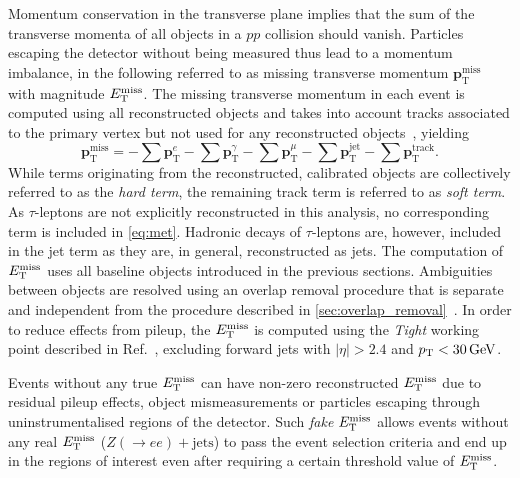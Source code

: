 Momentum conservation in the transverse plane implies that the sum of the transverse momenta of all objects in a $pp$ collision should vanish. Particles escaping the detector without being measured thus lead to a momentum imbalance, in the following referred to as missing transverse momentum $\boldsymbol{p}^{\textrm{miss}}_\textrm{T}$ with magnitude $E_{\textrm{T}}^{\textrm{miss}}$. The missing transverse momentum in each event is computed using all reconstructed objects and takes into account tracks associated to the primary vertex but not used for any reconstructed objects~\cite{PERF-2016-07}, yielding
\begin{equation}
	\boldsymbol{p}^{\textrm{miss}}_\textrm{T} = - \sum\boldsymbol{p}^{e}_{\textrm{T}} - \sum\boldsymbol{p}^{\gamma}_{\textrm{T}} - \sum\boldsymbol{p}^{\mu}_{\textrm{T}} - \sum\boldsymbol{p}^{\mathrm{jet}}_{\textrm{T}} - \sum\boldsymbol{p}^{\mathrm{track}}_{\textrm{T}}.
	\label{eq:met}
\end{equation}
While terms originating from the reconstructed, calibrated objects are collectively referred to as the \textit{hard term}, the remaining track term is referred to as \textit{soft term}. As $\tau$-leptons are not explicitly reconstructed in this analysis, no corresponding term is included in \cref{eq:met}. Hadronic decays of $\tau$-leptons are, however, included in the jet term as they are, in general, reconstructed as jets. The computation of $E_{\textrm{T}}^{\textrm{miss}}$ uses all baseline objects introduced in the previous sections. Ambiguities between objects are resolved using an overlap removal procedure that is separate and independent from the procedure described in \cref{sec:overlap_removal}~\cite{PERF-2016-07}. In order to reduce effects from pileup, the $E_{\textrm{T}}^{\textrm{miss}}$ is computed using the \textit{Tight} working point described in Ref.~\cite{ATLAS-CONF-2018-023}, excluding forward jets with $\vert\eta\vert > 2.4$ and $\pt < \SI{30}{\GeV}$.

Events without any true $E_{\textrm{T}}^{\textrm{miss}}$ can have non-zero reconstructed $E_{\textrm{T}}^{\textrm{miss}}$ due to residual pileup effects, object mismeasurements or particles escaping through uninstrumentalised regions of the detector. Such \textit{fake} $E_{\textrm{T}}^{\textrm{miss}}$ allows events without any real $E_{\textrm{T}}^{\textrm{miss}}$ (\eg $Z(\rightarrow ee)+\mathrm{jets}$) to pass the event selection criteria and end up in the regions of interest even after requiring a certain threshold value of $E_{\textrm{T}}^{\textrm{miss}}$.


